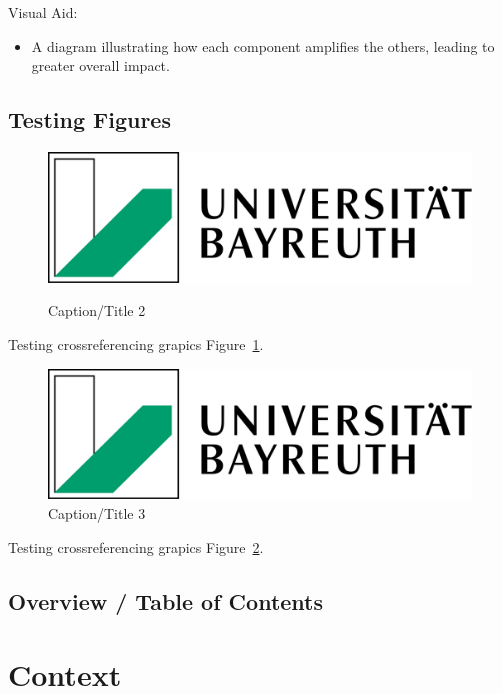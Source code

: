 \documentclass[
  letterpaper,
]{book}
\providecommand{\tightlist}{%
  \setlength{\itemsep}{0pt}\setlength{\parskip}{0pt}}
\begin{document}
Visual Aid:

\begin{itemize}
\tightlist
\item
  A diagram illustrating how each component amplifies the others,
  leading to greater overall impact.
\end{itemize}

\section{Testing Figures}\label{testing-figures}

\begin{figure}

\href{https://vjmeyer.com}{\includegraphics[width=0.3\linewidth,height=\textheight,keepaspectratio]{images/cover.png}}

\caption[Short 2 caption]{\label{fig-testgraphic2}Caption/Title 2}

\end{figure}%

Testing crossreferencing grapics Figure~\ref{fig-testgraphic2}.

\begin{figure}

\includegraphics[width=0.3\linewidth,height=\textheight,keepaspectratio]{images/cover.png}

\caption[Short 3 caption]{\label{fig-testgraphic3}Caption/Title 3}

\end{figure}%

Testing crossreferencing grapics Figure~\ref{fig-testgraphic3}.

\section{Overview / Table of Contents}\label{overview-table-of-contents}


\chapter{Context}\label{context}
\end{document}
